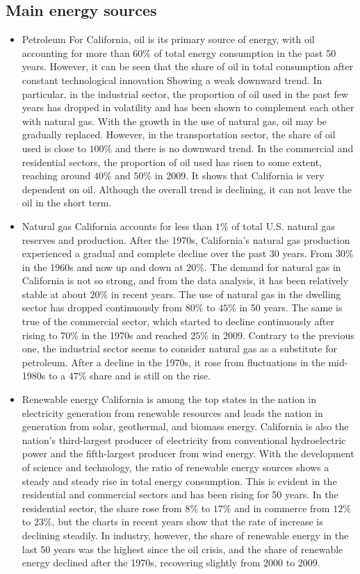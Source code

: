 \documentclass{mcmthesis}
\begin{document}
\subsection{Main energy sources}
\begin{itemize}
  \item Petroleum
  For California, oil is its primary source of energy, with oil accounting for more than $60\%$ of total energy consumption in the past 50 years. However, it can be seen that the share of oil in total consumption after constant technological innovation Showing a weak downward trend. In particular, in the industrial sector, the proportion of oil used in the past few years has dropped in volatility and has been shown to complement each other with natural gas. With the growth in the use of natural gas, oil may be gradually replaced. However, in the transportation sector, the share of oil used is close to $100\%$ and there is no downward trend. In the commercial and residential sectors, the proportion of oil used has risen to some extent, reaching around $40\%$ and $50\%$ in 2009. It shows that California is very dependent on oil. Although the overall trend is declining, it can not leave the oil in the short term.
  \item Natural gas
  California accounts for less than $1\%$ of total U.S. natural gas reserves and production. After the 1970s, California's natural gas production experienced a gradual and complete decline over the past 30 years. From $30\%$ in the 1960s and now up and down at $20\%$. The demand for natural gas in California is not so strong, and from the data analysis, it has been relatively stable at about $20\%$ in recent years. The use of natural gas in the dwelling sector has dropped continuously from $80\%$ to $45\%$ in 50 years. The same is true of the commercial sector, which started to decline continuously after rising to $70\%$ in the 1970s and reached $25\%$ in 2009. Contrary to the previous one, the industrial sector seems to consider natural gas as a substitute for petroleum. After a decline in the 1970s, it rose from fluctuations in the mid-1980s to a $47\%$ share and is still on the rise.
  \item Renewable energy
  California is among the top states in the nation in electricity generation from renewable resources and leads the nation in generation from solar, geothermal, and biomass energy. California is also the nation's third-largest producer of electricity from conventional hydroelectric power and the fifth-largest producer from wind energy. With the development of science and technology, the ratio of renewable energy sources shows a steady and steady rise in total energy consumption. This is evident in the residential and commercial sectors and has been rising for 50 years. In the residential sector, the share rose from $8\%$ to $17\%$ and in commerce from $12\%$ to $23\%$, but the charts in recent years show that the rate of increase is declining steadily. In industry, however, the share of renewable energy in the last 50 years was the highest since the oil crisis, and the share of renewable energy declined after the 1970s, recovering slightly from 2000 to 2009.

\end{itemize}
\end{document}
